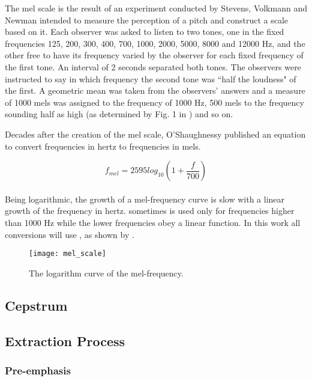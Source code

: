 The mel scale is the result of an experiment conducted by Stevens, Volkmann and
Newman \cite{stevens.volkmann.newman.1937} intended to measure the perception
of a pitch and construct a scale based on it. Each observer was asked to listen
to two tones, one in the fixed frequencies 125, 200, 300, 400, 700, 1000, 2000,
5000, 8000 and 12000 Hz, and the other free to have its frequency varied by the
observer for each fixed frequency of the first tone. An interval of 2 seconds
separated both tones. The observers were instructed to say in which frequency the
second tone was ``half the loudness" of the first. A geometric mean was taken from
the observers' answers and a measure of 1000 mels was assigned to the frequency
of 1000 Hz, 500 mels to the frequency sounding half as high (as determined by Fig. 1
in \cite{stevens.volkmann.newman.1937}) and so on.

Decades after the creation of the mel scale, O'Shaughnessy \cite{oshaughnessy.1987}
published an equation to convert frequencies in hertz to frequencies in mels.

\begin{equation}
    f_{mel} = 2595 log_{10}(1 + \frac{f}{700})
    \label{eq:mel_conversion}
\end{equation}
\\
\noindent Being logarithmic, the growth of a mel-frequency curve is slow with a
linear growth of the frequency in hertz.  sometimes
is used only for frequencies higher than 1000 Hz while the lower frequencies obey
a linear function. In this work all conversions will use ,
as shown by .

\begin{figure}[ht]
    \centering
    \texttt{[image: mel\_scale]}
    \caption{The logarithm curve of the mel-frequency.}
    \label{fig:mel_scale}
\end{figure}


\subsection{Cepstrum}


\subsection{Extraction Process}


\subsubsection{Pre-emphasis}